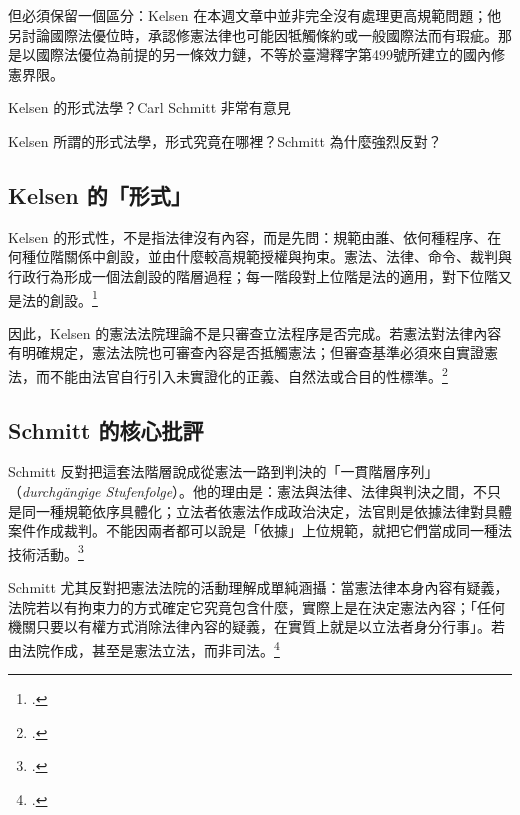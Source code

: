但必須保留一個區分：Kelsen 在本週文章中並非完全沒有處理更高規範問題；他另討論國際法優位時，承認修憲法律也可能因牴觸條約或一般國際法而有瑕疵。那是以國際法優位為前提的另一條效力鏈，不等於臺灣釋字第499號所建立的國內修憲界限。


\begin{qaprompt}
Kelsen 的形式法學？Carl Schmitt 非常有意見
\end{qaprompt}

\begin{qaquestion}
Kelsen 所謂的形式法學，形式究竟在哪裡？Schmitt 為什麼強烈反對？
\end{qaquestion}

\subsection{Kelsen 的「形式」}

Kelsen 的形式性，不是指法律沒有內容，而是先問：規範由誰、依何種程序、在何種位階關係中創設，並由什麼較高規範授權與拘束。憲法、法律、命令、裁判與行政行為形成一個法創設的階層過程；每一階段對上位階是法的適用，對下位階又是法的創設。\footcites[23--25]{kelsen2015}[31--33]{kelsen1929}

因此，Kelsen 的憲法法院理論不是只審查立法程序是否完成。若憲法對法律內容有明確規定，憲法法院也可審查內容是否抵觸憲法；但審查基準必須來自實證憲法，而不能由法官自行引入未實證化的正義、自然法或合目的性標準。\footcites[56, 59--61]{kelsen2015}[65, 68--70]{kelsen1929}

\subsection{Schmitt 的核心批評}

Schmitt 反對把這套法階層說成從憲法一路到判決的「一貫階層序列」（\emph{durchgängige Stufenfolge}）。他的理由是：憲法與法律、法律與判決之間，不只是同一種規範依序具體化；立法者依憲法作成政治決定，法官則是依據法律對具體案件作成裁判。不能因兩者都可以說是「依據」上位規範，就把它們當成同一種法技術活動。\footcites[109--111]{schmitt2015}[38--40 n.~2]{schmitt1931}

Schmitt 尤其反對把憲法法院的活動理解成單純涵攝：當憲法律本身內容有疑義，法院若以有拘束力的方式確定它究竟包含什麼，實際上是在決定憲法內容；「任何機關只要以有權方式消除法律內容的疑義，在實質上就是以立法者身分行事」。若由法院作成，甚至是憲法立法，而非司法。\footcites[116--120]{schmitt2015}[45--48]{schmitt1931}

